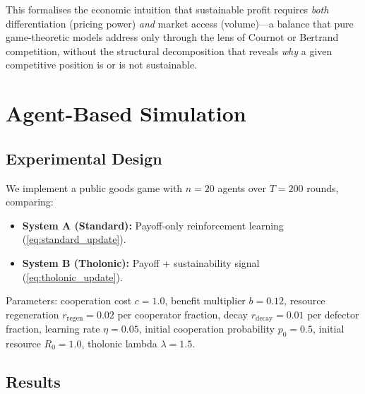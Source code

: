 \documentclass[12pt,a4paper,twocolumn]{article}
\begin{document}
This formalises the economic intuition that sustainable profit requires \emph{both} differentiation (pricing power) \emph{and} market access (volume)---a balance that pure game-theoretic models address only through the lens of Cournot or Bertrand competition, without the structural decomposition that reveals \emph{why} a given competitive position is or is not sustainable.

\section{Agent-Based Simulation}
\label{sec:simulation}

\subsection{Experimental Design}

We implement a public goods game with $n = 20$ agents over $T = 200$ rounds, comparing:

\begin{itemize}[nosep]
  \item \textbf{System A (Standard):} Payoff-only reinforcement learning (\cref{eq:standard_update}).
  \item \textbf{System B (Tholonic):} Payoff + sustainability signal (\cref{eq:tholonic_update}).
\end{itemize}

Parameters: cooperation cost $c = 1.0$, benefit multiplier $b = 0.12$, resource regeneration $r_{\mathrm{regen}} = 0.02$ per cooperator fraction, decay $r_{\mathrm{decay}} = 0.01$ per defector fraction, learning rate $\eta = 0.05$, initial cooperation probability $p_0 = 0.5$, initial resource $R_0 = 1.0$, tholonic lambda $\lambda = 1.5$.

\subsection{Results}
\end{document}

